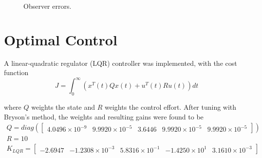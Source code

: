 \documentclass[]{aiaa-tc}%
\begin{document}
	\begin{figure}[H]
		\centering
		\caption{Observer errors. }
		\label{fig:Controller1ObsErrors}
	\end{figure}	

	\section{Optimal Control}

	A linear-quadratic regulator (LQR) controller was implemented, with the cost function
\begin{equation}
J=\int_{0}^{\infty}\left ( x^T(t)Qx(t)+u^T(t)Ru(t) \right )dt
\end{equation}

\noindent
where $Q$ weights the state and $R$ weights the control effort. After tuning with Bryson's method, the weights and resulting gains were found to be
\begin{equation}
\begin{matrix}
Q=diag(\begin{bmatrix}
4.0496\times10^{-9} & 9.9920\times10^{-5} & 3.6446 & 9.9920\times10^{-5} & 9.9920\times10^{-5}
\end{bmatrix})\\ 
R = 10\\ 

K_{LQR}=\begin{bmatrix}
-2.6947 & -1.2308\times10^{-3} & 5.8316\times10^{-1} & -1.4250\times10^{1} & 3.1610\times10^{-3}\end{bmatrix}
\end{matrix}
\end{equation}
\end{document}
